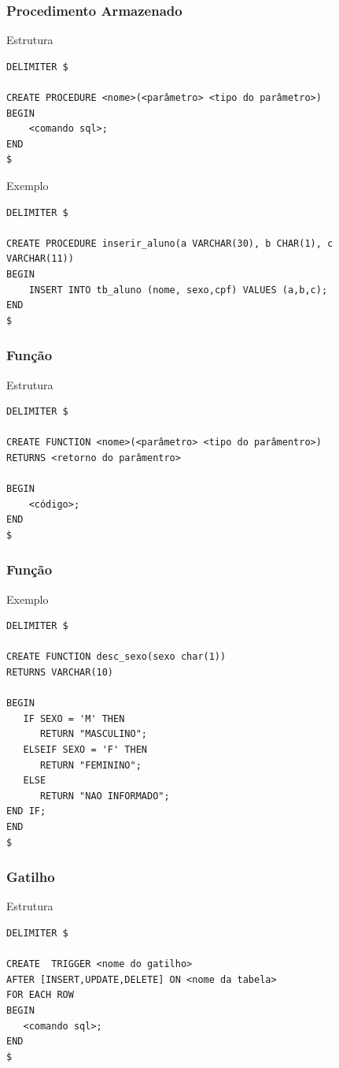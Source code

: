 \documentclass{beamer}
\begin{document}
\begin{frame}[fragile]
\frametitle{Procedimento Armazenado}

\begin{block}{Estrutura}
	\begin{lstlisting}
DELIMITER $

CREATE PROCEDURE <nome>(<parâmetro> <tipo do parâmetro>)
BEGIN
    <comando sql>;
END
$
	\end{lstlisting}
\end{block}\vfill

\begin{exampleblock}{Exemplo}
	\begin{lstlisting}
DELIMITER $

CREATE PROCEDURE inserir_aluno(a VARCHAR(30), b CHAR(1), c VARCHAR(11))
BEGIN
    INSERT INTO tb_aluno (nome, sexo,cpf) VALUES (a,b,c);
END
$	\end{lstlisting}
\end{exampleblock}
\end{frame}

\begin{frame}[fragile]
\frametitle{Função}

\begin{block}{Estrutura}
	\begin{lstlisting}
DELIMITER $

CREATE FUNCTION <nome>(<parâmetro> <tipo do parâmentro>) 
RETURNS <retorno do parâmentro>

BEGIN
    <código>;
END
$
	\end{lstlisting}
\end{block}
\end{frame}

\begin{frame}[fragile]
\frametitle{Função}

\begin{exampleblock}{Exemplo}
	\begin{lstlisting}
DELIMITER $
	
CREATE FUNCTION desc_sexo(sexo char(1)) 
RETURNS VARCHAR(10)

BEGIN
   IF SEXO = 'M' THEN
      RETURN "MASCULINO";
   ELSEIF SEXO = 'F' THEN
      RETURN "FEMININO"; 
   ELSE 
      RETURN "NAO INFORMADO";
END IF;
END
$
	\end{lstlisting}
\end{exampleblock}
\end{frame}

\begin{frame}[fragile]
\frametitle{Gatilho}

\begin{block}{Estrutura}
	\begin{lstlisting}
DELIMITER $

CREATE  TRIGGER <nome do gatilho> 
AFTER [INSERT,UPDATE,DELETE] ON <nome da tabela> 
FOR EACH ROW 
BEGIN 
   <comando sql>;
END
$
	\end{lstlisting}
\end{block}
\end{frame}
\end{document}

